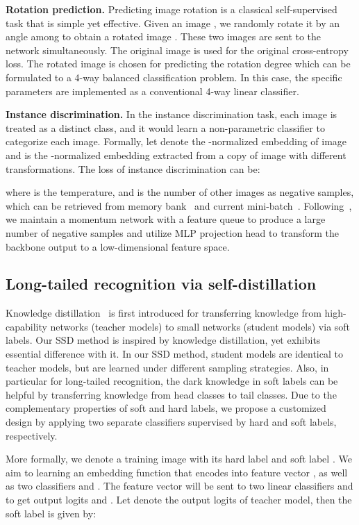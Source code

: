 \documentclass[10pt,twocolumn,letterpaper]{article}
\begin{document}
\noindent\textbf{Rotation prediction.} Predicting image rotation is a classical self-supervised task that is simple yet effective. Given an image , we randomly rotate it by an angle among  to obtain a rotated image . These two images are sent to the network simultaneously. The original image  is used for the original cross-entropy loss. The rotated image  is chosen for predicting the rotation degree
which can be formulated to a 4-way balanced classification problem. In this case, the specific parameters  are implemented as a conventional 4-way linear classifier.

\noindent\textbf{Instance discrimination.} In the instance discrimination task, each image is treated as a distinct class, and it would learn a non-parametric classifier to categorize each image. Formally, let  denote the -normalized embedding of image  and  is the -normalized embedding extracted from a copy of image  with different transformations. The loss of instance discrimination can be:

where  is the temperature, and  is the number of other images as negative samples, which can be retrieved from memory bank~\cite{insdis, moco} and current mini-batch~\cite{simclr}. Following~\cite{strongmoco}, we maintain a momentum network with a feature queue to produce a large number of negative samples and utilize MLP projection head  to transform the backbone output to a low-dimensional feature space.

\subsection{Long-tailed recognition via self-distillation}
\label{subsec:selfdistill}
Knowledge distillation~\cite{kd_hinton} is first introduced for transferring knowledge from high-capability networks (teacher models) to small networks (student models) via soft labels. Our SSD method is inspired by knowledge distillation, yet exhibits essential difference with it. In our SSD method, student models are identical to teacher models, but are learned under different sampling strategies. Also, in particular for long-tailed recognition, the dark knowledge in soft labels can be helpful by transferring knowledge from head classes to tail classes. Due to the complementary properties of soft and hard labels, we propose a customized design by applying two separate classifiers supervised by hard and soft labels, respectively.

More formally, we denote  a training image with its hard label  and soft label . We aim to learning an embedding function  that encodes  into feature vector , as well as two classifiers  and . The feature vector  will be sent to two linear classifiers  and  to get output logits  and . Let  denote the output logits of teacher model, then the soft label is given by:
\end{document}
